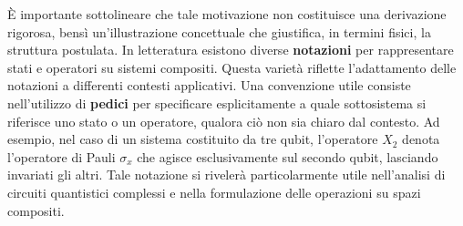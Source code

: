 \documentclass[a4paper,12pt]{report}
\theoremstyle{plain}
\begin{document}
È importante sottolineare che tale motivazione non costituisce una derivazione rigorosa, bensì un'illustrazione concettuale che giustifica, in termini fisici, la struttura postulata.
In letteratura esistono diverse \textbf{notazioni} per rappresentare stati e operatori su sistemi compositi. Questa varietà riflette l'adattamento delle notazioni a differenti contesti applicativi. Una convenzione utile consiste nell'utilizzo di \textbf{pedici} per specificare esplicitamente a quale sottosistema si riferisce uno stato o un operatore, qualora ciò non sia chiaro dal contesto. Ad esempio, nel caso di un sistema costituito da tre qubit, l'operatore $X_2$ denota l'operatore di Pauli $\sigma_x$ che agisce esclusivamente sul secondo qubit, lasciando invariati gli altri.
Tale notazione si rivelerà particolarmente utile nell'analisi di circuiti quantistici complessi e nella formulazione delle operazioni su spazi compositi.
\end{document}
